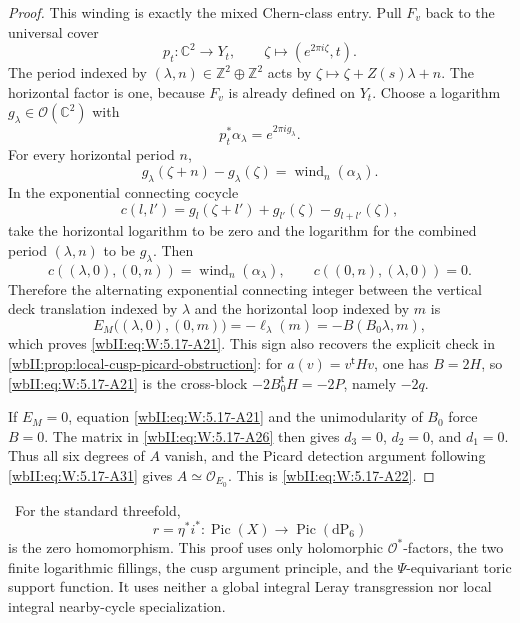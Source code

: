 \begin{proof}
This winding is exactly the mixed Chern-class entry.  Pull \(F_v\) back to
the universal cover
\[
 p_t:\mathbb C^2\longrightarrow Y_t,
 \qquad \zeta\longmapsto(e^{2\pi i\zeta},t).
\]
The period indexed by \((\lambda,n)\in\mathbb Z^2\oplus\mathbb Z^2\)
acts by \(\zeta\mapsto\zeta+Z(s)\lambda+n\).  The horizontal factor is one,
because \(F_v\) is already defined on \(Y_t\).  Choose a logarithm
\(g_\lambda\in\mathcal O(\mathbb C^2)\) with
\[
 p_t^*\alpha_\lambda=e^{2\pi i g_\lambda}.
\]
For every horizontal period \(n\),
\[
 g_\lambda(\zeta+n)-g_\lambda(\zeta)
 =\operatorname{wind}_n(\alpha_\lambda).
\]
In the exponential connecting cocycle
\[
 c(l,l')=g_l(\zeta+l')+g_{l'}(\zeta)-g_{l+l'}(\zeta),
\]
take the horizontal logarithm to be zero and the logarithm for the combined
period \((\lambda,n)\) to be \(g_\lambda\).  Then
\[
 c((\lambda,0),(0,n))
 =\operatorname{wind}_n(\alpha_\lambda),
 \qquad
 c((0,n),(\lambda,0))=0.
\]
Therefore the alternating exponential connecting integer between
the vertical deck
translation indexed by \(\lambda\) and the horizontal loop indexed by
\(m\) is
\[
 E_M\bigl((\lambda,0),(0,m)\bigr)
 =-\ell_\lambda(m)
 =-B(B_0\lambda,m),
\]
which proves \eqref{wbII:eq:W:5.17-A21}.  This sign also recovers the explicit check in
\cref{wbII:prop:local-cusp-picard-obstruction}: for
\(a(v)=v^{\mathsf t}Hv\), one has \(B=2H\), so \eqref{wbII:eq:W:5.17-A21} is the
cross-block \(-2B_0^{\mathsf t}H=-2P\), namely \(-2q\).

If \(E_M=0\), equation \eqref{wbII:eq:W:5.17-A21} and the unimodularity of \(B_0\) force
\(B=0\).  The matrix in \eqref{wbII:eq:W:5.17-A26} then gives
\(d_3=0\), \(d_2=0\), and \(d_1=0\).  Thus all six degrees of \(A\)
vanish, and the Picard detection argument following \eqref{wbII:eq:W:5.17-A31} gives
\(A\simeq\mathcal O_{E_0}\).  This is \eqref{wbII:eq:W:5.17-A22}.
\end{proof}

\begin{theorem}
\label{wbII:thm:analytic-all-picard}
\ For the standard threefold,
\[
 r=\eta^*i^*:\operatorname{Pic}(X)\longrightarrow
 \operatorname{Pic}(\mathrm{dP}_6)
\]
is the zero homomorphism.  This proof uses only holomorphic
\(\mathcal O^*\)-factors, the two finite logarithmic fillings, the cusp
argument principle, and the \(\Psi\)-equivariant toric support function.
It uses neither a global integral Leray transgression nor local integral
nearby-cycle specialization.
\end{theorem}


